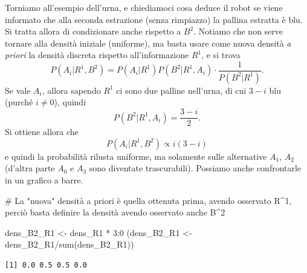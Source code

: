 \documentclass[
  italian,
  letterpaper,
]{book}
\newenvironment{Shaded}{\begin{snugshade}}{\end{snugshade}}
\newcommand{\CommentTok}[1]{\textcolor[rgb]{0.37,0.37,0.37}{#1}}
\newcommand{\DecValTok}[1]{\textcolor[rgb]{0.68,0.00,0.00}{#1}}
\newcommand{\FunctionTok}[1]{\textcolor[rgb]{0.28,0.35,0.67}{#1}}
\newcommand{\NormalTok}[1]{\textcolor[rgb]{0.00,0.23,0.31}{#1}}
\newcommand{\OtherTok}[1]{\textcolor[rgb]{0.00,0.23,0.31}{#1}}
\newcommand{\SpecialCharTok}[1]{\textcolor[rgb]{0.37,0.37,0.37}{#1}}
\theoremstyle{definition}
\theoremstyle{remark}
\begin{document}
Torniamo all'esempio dell'urna, e chiediamoci cosa deduce il robot se
viene informato che alla seconda estrazione (senza rimpiazzo) la pallina
estratta è blu. Si tratta allora di condizionare anche rispetto a
\(B^2\). Notiamo che non serve tornare alla densità iniziale (uniforme),
ma basta usare come nuova densità \emph{a priori} la densità discreta
rispetto all'informazione \(R^1\), e si trova
\[ P(A_i | R^1,B^2 ) =  P(A_i|R^1) P(B^2 | R^1,A_i) \cdot \frac{1}{P(B^2|R^1)}.\]
Se vale \(A_i\), allora sapendo \(R^1\) ci sono due palline nell'urna,
di cui \(3-i\) blu (purché \(i \neq 0\)), quindi
\[P(B^2 |R^1, A_i) = \frac{3-i}{2}.\] Si ottiene allora che
\[ P(A_i|R^1, B^2) \propto i (3-i)\] e quindi la probabilità rilusta
uniforme, ma solamente sulle alternative \(A_1\), \(A_2\) (d'altra parte
\(A_0\) e \(A_3\) sono diventate trascurabili). Possiamo anche
confrontarle in un grafico a barre.

\begin{Shaded}
\begin{Highlighting}[]
\CommentTok{\# La "nuova" densità a priori è quella ottenuta prima, avendo osservato R\^{}1, perciò basta definire la densità avendo osservato anche B\^{}2}

\NormalTok{dens\_B2\_R1 }\OtherTok{\textless{}{-}}\NormalTok{ dens\_R1 }\SpecialCharTok{*} \DecValTok{3}\SpecialCharTok{:}\DecValTok{0}
\NormalTok{(dens\_B2\_R1 }\OtherTok{\textless{}{-}}\NormalTok{ dens\_B2\_R1}\SpecialCharTok{/}\FunctionTok{sum}\NormalTok{(dens\_B2\_R1))}
\end{Highlighting}
\end{Shaded}

\begin{verbatim}
[1] 0.0 0.5 0.5 0.0
\end{verbatim}
\end{document}

